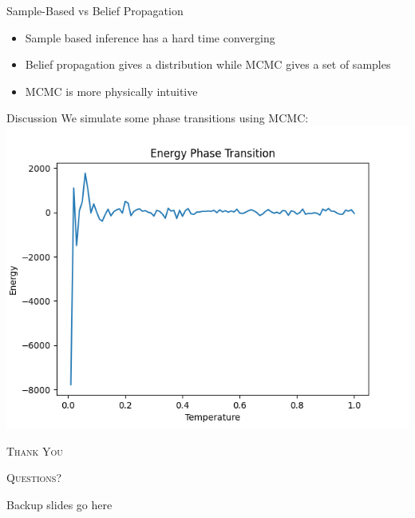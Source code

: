 \documentclass{minesbeamer}
\begin{document}
\begin{frame}{Sample-Based vs Belief Propagation}
    \begin{itemize}
        \item 
        Sample based inference has a hard time converging
        \item 
        Belief propagation gives a distribution while MCMC gives a set of 
        samples
        \item MCMC is more physically intuitive
    \end{itemize}
\end{frame}

\begin{frame}{Discussion}
    We simulate some phase transitions using MCMC:
    \includegraphics[height=0.6\textheight]{mcmc_phase.png}
\end{frame}

\begin{frame}[standout]
    \Huge\textsc{Thank You}
    
    \vfill
    
    \LARGE\textsc{Questions?}
\end{frame}

\appendix

\begin{frame}{Backup slides go here}
    
\end{frame}
\end{document}
